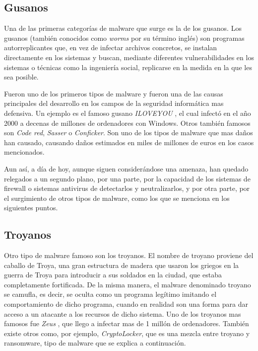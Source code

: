 \subsection{Gusanos}

Una de las primeras categorías de malware que surge es la de los gusanos. Los gusanos (también conocidos como \textit{worms} por su término inglés) son programas autorreplicantes que, en vez de infectar archivos concretos, se instalan directamente en los sistemas y buscan, mediante diferentes vulnerabilidades en los sistemas o técnicas como la ingeniería social, replicarse en la medida en la que les sea posible.

Fueron uno de los primeros tipos de malware y fueron una de las causas principales del desarrollo en los campos de la seguridad informática mas defensiva. Un ejemplo es el famoso gusano \emph{ILOVEYOU} \cite{top-10-viruses}, el cual infectó en el año 2000 a decenas de millones de ordenadores con Windows. Otros también famosos son \emph{Code red}, \emph{Sasser} o \emph{Conficker}. Son uno de los tipos de malware que mas daños han causado, causando daños estimados en miles de millones de euros en los casos mencionados.

Aun así, a día de hoy, aunque siguen considerándose una amenaza, han quedado relegados a un segundo plano, por una parte, por la capacidad de los sistemas de firewall o sistemas antivirus de detectarlos y neutralizarlos, y por otra parte, por el surgimiento de otros tipos de malware, como los que se menciona en los siguientes puntos.

\subsection{Troyanos}

Otro tipo de malware famoso son los troyanos. El nombre de troyano proviene del caballo de Troya, una gran estructura de madera que usaron los griegos en la guerra de Troya para introducir a sus soldados en la ciudad, que estaba completamente fortificada. De la misma manera, el malware denominado troyano se camufla, es decir, se oculta como un programa legítimo imitando el comportamiento de dicho programa, cuando en realidad son una forma para dar acceso a un atacante a los recursos de dicho sistema. Uno de los troyanos mas famosos fue \emph{Zeus} \cite{top-10-viruses}, que llego a infectar mas de 1 millón de ordenadores. También existe otros como, por ejemplo, \emph{CryptoLocker}, que es una mezcla entre troyano y ransomware, tipo de malware que se explica a continuación.

